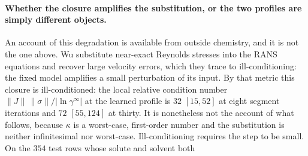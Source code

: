 \paragraph{Whether the closure amplifies the substitution, or the two profiles are simply different
objects.}
An account of this degradation is available from outside chemistry, and it is not the one above.
Wu \cite{wu2019illconditioned} substitute near-exact Reynolds stresses into the RANS
equations and recover large velocity errors, which they trace to ill-conditioning: the fixed model
amplifies a small perturbation of its input.
By that metric this closure is ill-conditioned: the local relative
condition number $\lVert J\rVert\,\lVert\sigma\rVert/\lvert\ln\gamma^\infty\rvert$ at the
learned profile is $32$ $[15,52]$ at eight segment iterations and $72$ $[55,124]$ at thirty. It is
nonetheless not the account of what follows, because $\kappa$ is a worst-case, first-order number
and the substitution is neither infinitesimal nor worst-case.
Ill-conditioning requires the step to be small. On the $354$ test rows whose solute and solvent both
